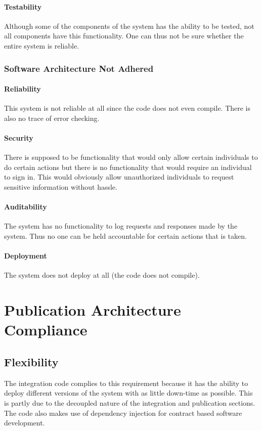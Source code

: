 \documentclass{article}
\begin{document}
			\paragraph{Testability} Although some of the components of the system has the ability to be tested, not all components have this functionality. One can thus not be sure whether the entire system is reliable.			
			
		\subsubsection{Software Architecture Not Adhered}
			\paragraph{Reliability} This system is not reliable at all since the code does not even compile. There is also no trace of error checking.
			\paragraph{Security} There is supposed to be functionality that would only allow certain individuals to do certain actions but there is no functionality that would require an individual to sign in. This would obviously allow unauthorized individuals to request sensitive information without hassle.
			\paragraph{Auditability} The system has no functionality to log requests and responses made by the system. Thus no one can be held accountable for certain actions that is taken.
			\paragraph{Deployment} The system does not deploy at all (the code does not compile).

\section{Publication Architecture Compliance}
    \subsection{Flexibility}
    The integration code complies to this requirement because it has the ability to deploy different versions of the system with as little down-time as possible. This is partly due to the decoupled nature of the integration and publication sections. The code also makes use of dependency injection for contract based software development.
    
\end{document}
